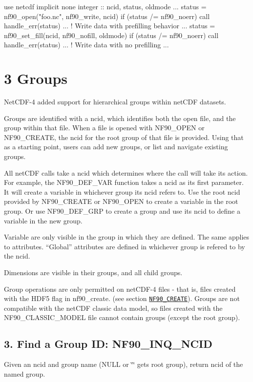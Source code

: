 \begin{DoxyCode}
\textcolor{keywordtype}{use }netcdf
\textcolor{keywordtype}{implicit none}
\textcolor{keywordtype}{integer} :: ncid, status, oldmode
...
status = nf90\_open(\textcolor{stringliteral}{"foo.nc"}, nf90\_write, ncid)
\textcolor{keywordflow}{if} (status /= nf90\_noerr) \textcolor{keyword}{call }handle\_err(status)
...  
\textcolor{comment}{! Write data with prefilling behavior}
...  
status = nf90\_set\_fill(ncid, nf90\_nofill, oldmode)
\textcolor{keywordflow}{if} (status /= nf90\_noerr) \textcolor{keyword}{call }handle\_err(status)
...
\textcolor{comment}{!  Write data with no prefilling}
...
\end{DoxyCode}
 \hypertarget{f90_groups}{}\section{3 Groups}\label{f90_groups}
Net\+C\+D\+F-\/4 added support for hierarchical groups within net\+C\+DF datasets.

Groups are identified with a ncid, which identifies both the open file, and the group within that file. When a file is opened with N\+F90\+\_\+\+O\+P\+EN or N\+F90\+\_\+\+C\+R\+E\+A\+TE, the ncid for the root group of that file is provided. Using that as a starting point, users can add new groups, or list and navigate existing groups.

All net\+C\+DF calls take a ncid which determines where the call will take its action. For example, the N\+F90\+\_\+\+D\+E\+F\+\_\+\+V\+AR function takes a ncid as its first parameter. It will create a variable in whichever group its ncid refers to. Use the root ncid provided by N\+F90\+\_\+\+C\+R\+E\+A\+TE or N\+F90\+\_\+\+O\+P\+EN to create a variable in the root group. Or use N\+F90\+\_\+\+D\+E\+F\+\_\+\+G\+RP to create a group and use its ncid to define a variable in the new group.

Variable are only visible in the group in which they are defined. The same applies to attributes. “\+Global” attributes are defined in whichever group is refered to by the ncid.

Dimensions are visible in their groups, and all child groups.

Group operations are only permitted on net\+C\+D\+F-\/4 files -\/ that is, files created with the H\+D\+F5 flag in nf90\+\_\+create. (see section \href{#NF90_005fCREATE}{\tt N\+F90\+\_\+\+C\+R\+E\+A\+TE}). Groups are not compatible with the net\+C\+DF classic data model, so files created with the N\+F90\+\_\+\+C\+L\+A\+S\+S\+I\+C\+\_\+\+M\+O\+D\+EL file cannot contain groups (except the root group).\hypertarget{f90_groups_f90-find-a-group-id-nf90_inq_ncid}{}\subsection{3. Find a Group I\+D\+: N\+F90\+\_\+\+I\+N\+Q\+\_\+\+N\+C\+I\+D }\label{f90_groups_f90-find-a-group-id-nf90_inq_ncid}
Given an ncid and group name (N\+U\+LL or \char`\"{}\char`\"{} gets root group), return ncid of the named group.


